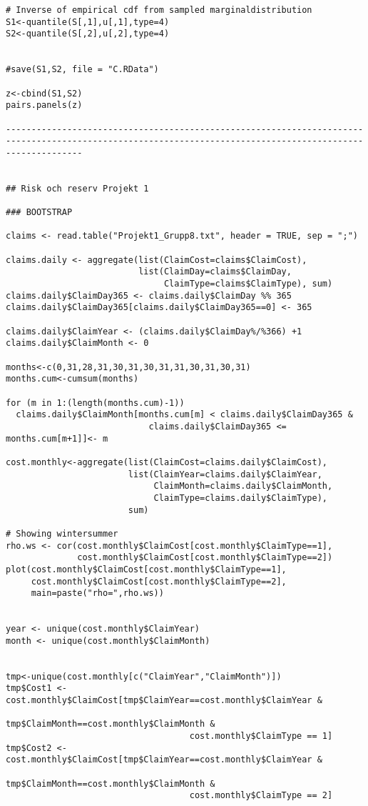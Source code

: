 \documentclass[11pt]{article}
\begin{document}
\begin{verbatim}
# Inverse of empirical cdf from sampled marginaldistribution 
S1<-quantile(S[,1],u[,1],type=4)
S2<-quantile(S[,2],u[,2],type=4)


#save(S1,S2, file = "C.RData")

z<-cbind(S1,S2)
pairs.panels(z)

-----------------------------------------------------------------------------------------------------------------------------------------------------------


## Risk och reserv Projekt 1

### BOOTSTRAP

claims <- read.table("Projekt1_Grupp8.txt", header = TRUE, sep = ";")

claims.daily <- aggregate(list(ClaimCost=claims$ClaimCost),
                          list(ClaimDay=claims$ClaimDay,
                               ClaimType=claims$ClaimType), sum)
claims.daily$ClaimDay365 <- claims.daily$ClaimDay %% 365
claims.daily$ClaimDay365[claims.daily$ClaimDay365==0] <- 365

claims.daily$ClaimYear <- (claims.daily$ClaimDay%/%366) +1
claims.daily$ClaimMonth <- 0

months<-c(0,31,28,31,30,31,30,31,31,30,31,30,31)
months.cum<-cumsum(months)

for (m in 1:(length(months.cum)-1))
  claims.daily$ClaimMonth[months.cum[m] < claims.daily$ClaimDay365 &
                            claims.daily$ClaimDay365 <= months.cum[m+1]]<- m

cost.monthly<-aggregate(list(ClaimCost=claims.daily$ClaimCost),
                        list(ClaimYear=claims.daily$ClaimYear,
                             ClaimMonth=claims.daily$ClaimMonth,
                             ClaimType=claims.daily$ClaimType),
                        sum)

# Showing wintersummer
rho.ws <- cor(cost.monthly$ClaimCost[cost.monthly$ClaimType==1],
              cost.monthly$ClaimCost[cost.monthly$ClaimType==2])
plot(cost.monthly$ClaimCost[cost.monthly$ClaimType==1],
     cost.monthly$ClaimCost[cost.monthly$ClaimType==2],
     main=paste("rho=",rho.ws))


year <- unique(cost.monthly$ClaimYear)
month <- unique(cost.monthly$ClaimMonth)


tmp<-unique(cost.monthly[c("ClaimYear","ClaimMonth")])
tmp$Cost1 <- cost.monthly$ClaimCost[tmp$ClaimYear==cost.monthly$ClaimYear &
                                    tmp$ClaimMonth==cost.monthly$ClaimMonth &
                                    cost.monthly$ClaimType == 1]
tmp$Cost2 <- cost.monthly$ClaimCost[tmp$ClaimYear==cost.monthly$ClaimYear &
                                    tmp$ClaimMonth==cost.monthly$ClaimMonth &
                                    cost.monthly$ClaimType == 2]


\end{verbatim}
\end{document}
